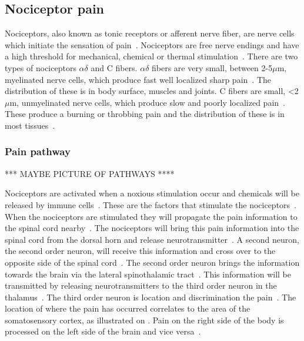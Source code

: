 \subsection{Nociceptor pain}
Nociceptors, also known as tonic receptors or afferent nerve fiber, are nerve cells which initiate the sensation of pain~\cite{Steeds2013, Martini2012}. Nociceptors are free nerve endings and have a high threshold for mechanical, chemical or thermal stimulation~\cite{Steeds2013}. There are two types of nociceptors $\alpha\delta$ and C fibers. $\alpha\delta$ fibers are very small, between 2-5$\mu$m, myelinated nerve cells, which produce fast well localized sharp pain~\cite{Steeds2013}. The distribution of these is in body surface, muscles and joints. C fibers are small, <2$\mu$m, unmyelinated nerve cells, which produce slow and poorly localized pain~\cite{Steeds2013}. These produce a burning or throbbing pain and the distribution of these is in most tissues~\cite{Steeds2013}. 

\subsubsection{Pain pathway}


*** MAYBE PICTURE OF PATHWAYS ****

Nociceptors are activated when a noxious stimulation occur and chemicals will be released by immune cells~\cite{Martini2012}. These are the factors that stimulate the nociceptors~\cite{Martini2012}. When the nociceptors are stimulated they will propagate the pain information to the spinal cord nearby~\cite{Martini2012}. The nociceptors will bring this pain information into the spinal cord from the dorsal horn and release neurotransmitter~\cite{Martini2012}. A second neuron, the second order neuron, will receive this information and cross over to the opposite side of the spinal cord~\cite{Martini2012}. The second order neuron brings the information towards the brain via the lateral spinothalamic tract~\cite{Martini2012}. This information will be transmitted by releasing neurotransmitters to the third order neuron in the thalamus~\cite{Martini2012}. The third order neuron is location and discrimination the pain~\cite{Martini2012}. The location of where the pain has occurred correlates to the area of the somatosensory cortex, as illustrated on . Pain on the right side of the body is processed on the left side of the brain and vice versa~\cite{Martini2012}. 

